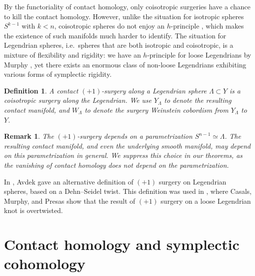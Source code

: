 \documentclass[reqno,11pt]{amsart}
\numberwithin{equation}{section}
\newtheorem{definition}[theorem]{\textbf{Definition}}
\newtheorem{remark}[theorem]{\textbf{Remark}}
\begin{document}
By the functoriality of contact homology, only coisotropic surgeries have a chance to kill the contact homology. However, unlike the situation for isotropic spheres $S^{k-1}$ with $k<n$, coisotropic spheres do not enjoy an $h$-principle \cite[Theorem 1.3 and Remark 6.1]{zbMATH06670705}, which makes the existence of such manifolds much harder to identify. The situation for Legendrian spheres, i.e.\ spheres that are both isotropic and coisotropic, is a mixture of flexibility and rigidity: we have an $h$-principle for loose Legendrians by Murphy \cite{MR4172336}, yet there exists an enormous class of non-loose Legendrians exhibiting various forms of symplectic rigidity. 

\begin{definition}
A contact $(+1)$-surgery along a Legendrian sphere $\Lambda \subset Y$ is a coisotropic surgery along the Legendrian. We use $Y_{\Lambda}$ to denote the resulting contact manifold, and $W_{\Lambda}$ to denote the surgery Weinstein cobordism from $Y_{\Lambda}$ to $Y$.  
\end{definition}

\begin{remark}
    The $(+1)$-surgery depends on a parametrization $S^{n-1}\simeq \Lambda$. The resulting contact manifold, and even the underlying smooth manifold, may depend on this parametrization in general. We suppress this choice in our theorems, as the vanishing of contact homology does not depend on the parametrization.
\end{remark}

In \cite{zbMATH07455583}, Avdek gave an alternative definition of $(+1)$ surgery on Legendrian spheres, based on a Dehn--Seidel twist. This definition was used in \cite{zbMATH07010365}, where Casals, Murphy, and Presas show that the result of $(+1)$ surgery on a loose Legendrian knot is overtwisted.
\section{Contact homology and symplectic cohomology}
\end{document}
